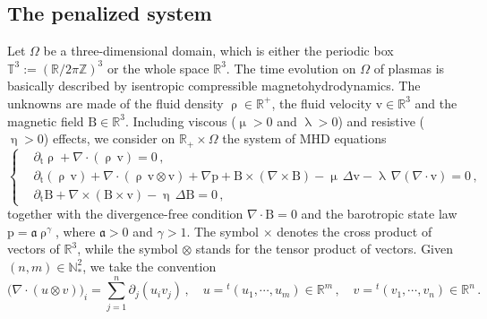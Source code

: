 \documentclass[11pt,reqno]{amsart}
\def \R{{\mathbb{R}}}
\def \N{{\mathbb{N}}}
\def \Z{{\mathbb{Z}}}
\def \T{{\mathbb{T}}}
\begin{document}
\subsection{The penalized system}
\label{ss:penalized}
Let $\Omega$ be a  three-dimensional domain, which is either the periodic box $\T^3 :=(\R/2 \pi \Z)^3 $ or the whole space $\R^3$. The time evolution on $ \Omega $ of plasmas is basically  described by isentropic compressible magnetohydrodynamics. The unknowns are made of the fluid density $\uprho \in \R^+ $, the fluid velocity $ \text{v} \in \R^3 $ and the magnetic field $ \text{B} \in \R^3 $.  Including viscous ($ \upmu >0 $ and $  \uplambda >0 $) and resistive ($ \upeta >0 $) effects, we consider on $ \mathbb R_+ \times \Omega $ the system of MHD equations
\begin{equation}
\left \{
\begin{aligned}
&\partial_{\text{t}} \uprho + \nabla \cdot ( \uprho \,  \text{v}) = 0 \,, \\
&\partial_{\text{t}} ( \uprho \, \text{v}) + \nabla \cdot (\uprho \, \text{v} \otimes \text{v})
  + \nabla \text{p} +  \text{B} \times (\nabla \times \text{B} ) -\upmu \,  \Delta \text{v} -  \uplambda \, \nabla (\nabla \cdot \text{v}) =0 \,,  \\
&\partial_{\text{t}} \text{B} +  \nabla \times ( \text{B}  \times \text{v})
-  \upeta \, \Delta \text{B} =0\, ,
\end{aligned}
\right.
\label{mhdorigin}
\end{equation}
together with the divergence-free condition $  \nabla \cdot \text{B} =0 $ and the barotropic state law $ \text{p}= \mathfrak{a}\uprho^\gamma $, where $ \mathfrak{a} >0 $ and $ \gamma >1 $. The symbol $\times$ denotes the cross product of vectors of $\R^3$, while the symbol $\otimes $ stands for the tensor product of vectors. Given $ (n,m) \in \N_*^2 $, we take the convention
\[
\big(\nabla \cdot (u \otimes v)\big)_i = \sum_{j=1}^n \partial_j (u_i v_j) \, , \quad u = {}^t (u_1,\cdots,u_m) \in \R^m \, , \quad v = {}^t (v_1,\cdots,v_n) \in \R^n \, .
\]
\end{document}
